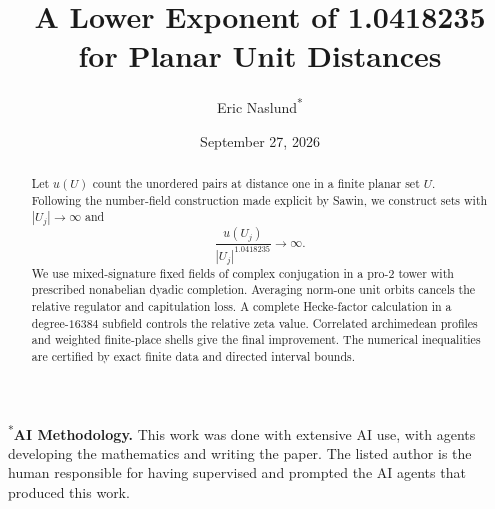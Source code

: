 \documentclass[11pt]{amsart}
\title[A Lower Exponent for Planar Unit Distances]{A Lower Exponent of 1.0418235\\for Planar Unit Distances}
\author[Eric Naslund]{Eric Naslund\textsuperscript{*}}
\date{September 27, 2026}
\theoremstyle{definition}
\theoremstyle{remark}
\numberwithin{equation}{section}
\begin{document}
\begin{abstract}
Let $u(U)$ count the unordered pairs at distance one in a finite planar
set $U$. Following the number-field construction made explicit by Sawin,
we construct sets with $|U_j|\to\infty$ and
\[
 \frac{u(U_j)}{|U_j|^{1.0418235}}\longrightarrow\infty.
\]
We use mixed-signature fixed fields of complex conjugation in a pro-$2$
tower with prescribed nonabelian dyadic completion. Averaging norm-one
unit orbits cancels the relative regulator and capitulation loss.
A complete Hecke-factor calculation in a degree-$16384$ subfield
controls the relative zeta value. Correlated archimedean profiles
and weighted finite-place shells give the final improvement.
The numerical inequalities are certified by exact finite data and
directed interval bounds.
\end{abstract}
\maketitle

{\noindent\small\textsuperscript{*}\textbf{AI Methodology.} This work was
done with extensive AI use, with agents developing the mathematics and
writing the paper. The listed author is the human responsible for having
supervised and prompted the AI agents that produced this work.\par}
\medskip
\tableofcontents
\clearpage








\clearpage


\end{document}
